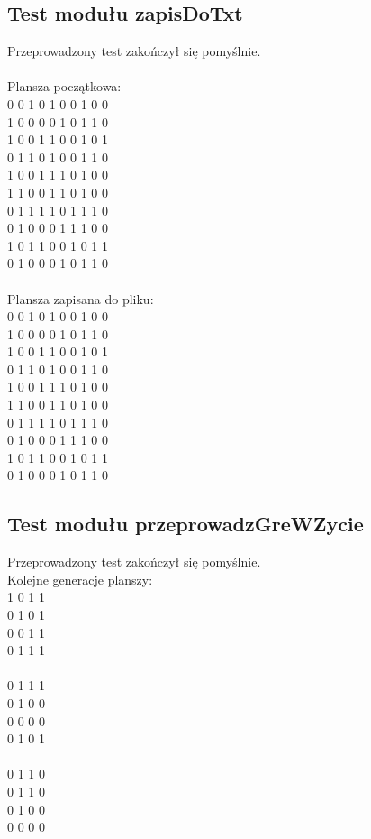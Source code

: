 \documentclass[10pt, oneside]{article}
\begin{document}
\subsection{Test modułu zapisDoTxt}
Przeprowadzony test zakończył się pomyślnie. \\
\\
Plansza początkowa:\\
0 0 1 0 1 0 0 1 0 0\\
1 0 0 0 0 1 0 1 1 0\\
1 0 0 1 1 0 0 1 0 1\\
0 1 1 0 1 0 0 1 1 0\\
1 0 0 1 1 1 0 1 0 0\\
1 1 0 0 1 1 0 1 0 0\\
0 1 1 1 1 0 1 1 1 0\\
0 1 0 0 0 1 1 1 0 0\\
1 0 1 1 0 0 1 0 1 1\\
0 1 0 0 0 1 0 1 1 0\\
\\
Plansza zapisana do pliku:\\
0 0 1 0 1 0 0 1 0 0\\
1 0 0 0 0 1 0 1 1 0\\
1 0 0 1 1 0 0 1 0 1\\
0 1 1 0 1 0 0 1 1 0\\
1 0 0 1 1 1 0 1 0 0\\
1 1 0 0 1 1 0 1 0 0\\
0 1 1 1 1 0 1 1 1 0\\
0 1 0 0 0 1 1 1 0 0\\
1 0 1 1 0 0 1 0 1 1\\
0 1 0 0 0 1 0 1 1 0\\

\subsection{Test modułu przeprowadzGreWZycie}
Przeprowadzony test zakończył się pomyślnie.\\ 
Kolejne generacje planszy:\\
1 0 1 1 \\
0 1 0 1 \\
0 0 1 1 \\
0 1 1 1 \\
\\
0 1 1 1 \\
0 1 0 0 \\
0 0 0 0 \\
0 1 0 1 \\
\\
0 1 1 0\\ 
0 1 1 0 \\
0 1 0 0 \\
0 0 0 0\\
\end{document}
